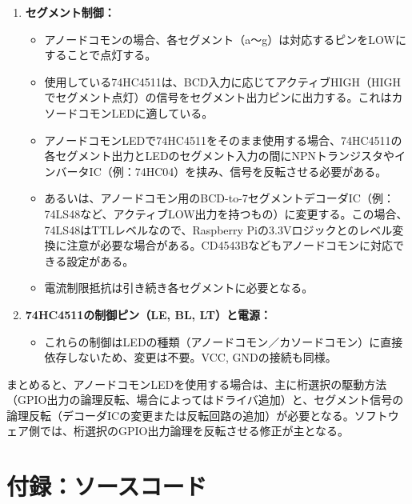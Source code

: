 \documentclass[a4paper,11pt,dvipdfmx]{jsarticle}
\begin{document}
\begin{enumerate}
    \item \textbf{セグメント制御：}
    \begin{itemize}
        \item アノードコモンの場合、各セグメント（a〜g）は対応するピンをLOWにすることで点灯する。
        \item 使用している74HC4511は、BCD入力に応じてアクティブHIGH（HIGHでセグメント点灯）の信号をセグメント出力ピンに出力する。これはカソードコモンLEDに適している。
        \item アノードコモンLEDで74HC4511をそのまま使用する場合、74HC4511の各セグメント出力とLEDのセグメント入力の間にNPNトランジスタやインバータIC（例：74HC04）を挟み、信号を反転させる必要がある。
        \item あるいは、アノードコモン用のBCD-to-7セグメントデコーダIC（例：74LS48など、アクティブLOW出力を持つもの）に変更する。この場合、74LS48はTTLレベルなので、Raspberry Piの3.3Vロジックとのレベル変換に注意が必要な場合がある。CD4543Bなどもアノードコモンに対応できる設定がある。
        \item 電流制限抵抗は引き続き各セグメントに必要となる。
    \end{itemize}

    \item \textbf{74HC4511の制御ピン（LE, BL, LT）と電源：}
    \begin{itemize}
        \item これらの制御はLEDの種類（アノードコモン／カソードコモン）に直接依存しないため、変更は不要。VCC, GNDの接続も同様。
    \end{itemize}
\end{enumerate}
まとめると、アノードコモンLEDを使用する場合は、主に桁選択の駆動方法（GPIO出力の論理反転、場合によってはドライバ追加）と、セグメント信号の論理反転（デコーダICの変更または反転回路の追加）が必要となる。ソフトウェア側では、桁選択のGPIO出力論理を反転させる修正が主となる。

\section{付録：ソースコード}

\end{document}
